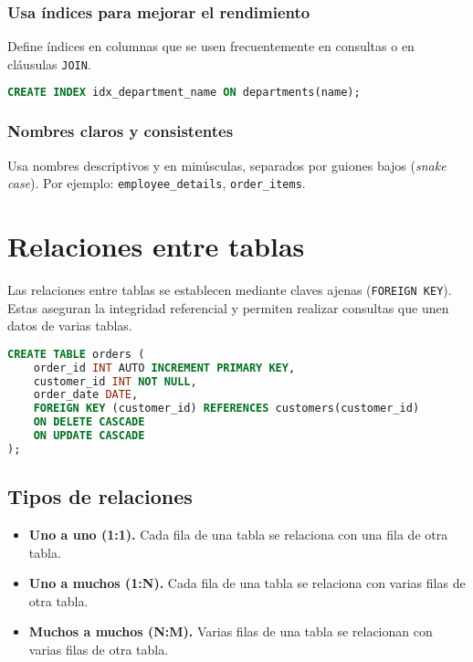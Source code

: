 \subsubsection{Usa índices para mejorar el rendimiento}

Define índices en columnas que se usen frecuentemente en
consultas o en cláusulas \texttt{JOIN}.

\begin{lstlisting}[language=SQL]
CREATE INDEX idx_department_name ON departments(name);
\end{lstlisting}

\subsubsection{Nombres claros y consistentes}

Usa nombres descriptivos y en minúsculas, separados por
guiones bajos (\textit{snake case}). Por ejemplo:
\texttt{employee\_details}, \texttt{order\_items}.

\section{Relaciones entre tablas}

Las relaciones entre tablas se establecen mediante claves
ajenas (\texttt{FOREIGN KEY}). Estas aseguran la integridad
referencial y permiten realizar consultas que unen datos
de varias tablas.

\begin{lstlisting}[language=SQL]
CREATE TABLE orders (
    order_id INT AUTO INCREMENT PRIMARY KEY,
    customer_id INT NOT NULL,
    order_date DATE,
    FOREIGN KEY (customer_id) REFERENCES customers(customer_id)
    ON DELETE CASCADE
    ON UPDATE CASCADE
);
\end{lstlisting}

\subsection{Tipos de relaciones}

\begin{itemize}
    \item \textbf{Uno a uno (1:1).} Cada fila de una tabla se relaciona con una fila de otra tabla.
    \item \textbf{Uno a muchos (1:N).} Cada fila de una tabla se relaciona con varias filas de otra tabla.
    \item \textbf{Muchos a muchos (N:M).} Varias filas de una tabla se relacionan con varias filas de otra tabla.
\end{itemize}

